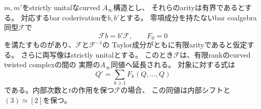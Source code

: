 \begin{lemma}
\label{cg:lem:tw-extension}
$m,m'$をstrictly unitalなcurved $A_\infty$構造とし、
それらのarityは有界であるとする。
対応するbar coderivationを$b,b'$とする。
零項成分を持たないbar coalgebra同型$\mathcal F$で
\[
 \mathcal F b=b'\mathcal F,\qquad F_0=0
\]
を満たすものがあり、$\mathcal F$と$\mathcal F^{-1}$の
Taylor成分がともに有限arityであると仮定する。
さらに両写像はstrictly unitalとする。
このとき$\mathcal F$は、有限rankのcurved twisted complexの間の
実際の$A_\infty$同値へ延長される。
対象に対する式は
\begin{equation}\label{cg:eq:object-map}
 Q'=\sum_{k\ge1}F_k(Q,\ldots,Q)
\end{equation}
である。内部次数と$t$の作用を保つ$\mathcal F$の場合、
この同値は内部シフトと$(3)\simeq[2]$を保つ。
\end{lemma}
